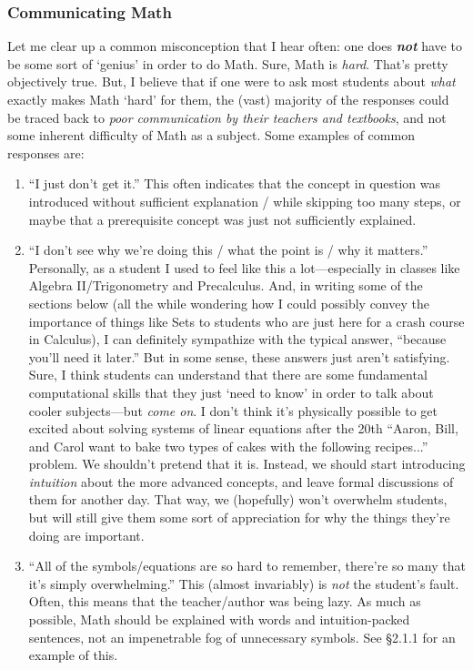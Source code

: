 \documentclass[10pt]{article}
\theoremstyle{definition}
\begin{document}
\subsubsection{Communicating Math}
Let me clear up a common misconception that I hear often: one does \emph{\textbf{not}} have to be some sort of `genius' in order to do Math.  Sure, Math is \emph{hard}.  That's pretty objectively true.  But, I believe that if one were to ask most students about \emph{what} exactly makes Math `hard' for them, the (vast) majority of the responses could be traced back to \emph{poor communication by their teachers and textbooks}, and not some inherent difficulty of Math as a subject.  Some examples of common responses are:
\begin{enumerate}
    \item ``I just don't get it.''  This often indicates that the concept in question was introduced without sufficient explanation / while skipping too many steps, or maybe that a prerequisite concept was just not sufficiently explained.  
    \item ``I don't see why we're doing this / what the point is / why it matters.''  Personally, as a student I used to feel like this a lot---especially in classes like Algebra II/Trigonometry and Precalculus.  And, in writing some of the sections below (all the while wondering how I could possibly convey the importance of things like Sets to students who are just here for a crash course in Calculus), I can definitely sympathize with the typical answer, ``because you'll need it later.''  But in some sense, these answers just aren't satisfying.  Sure, I think students can understand that there are some fundamental computational skills that they just `need to know' in order to talk about cooler subjects---but \emph{come on}.  I don't think it's physically possible to get excited about solving systems of linear equations after the 20th ``Aaron, Bill, and Carol want to bake two types of cakes with the following recipes...'' problem.  We shouldn't pretend that it is.  Instead, we should start introducing \emph{intuition} about the more advanced concepts, and leave formal discussions of them for another day.  That way, we (hopefully) won't overwhelm students, but will still give them some sort of appreciation for why the things they're doing are important.
    \item ``All of the symbols/equations are so hard to remember, there're so many that it's simply overwhelming.''  This (almost invariably) is \emph{not} the student's fault.  Often, this means that the teacher/author was being lazy.  As much as possible, Math should be explained with words and intuition-packed sentences, not an impenetrable fog of unnecessary symbols.  See \S 2.1.1 for an example of this.  
\end{enumerate}  
\end{document}

